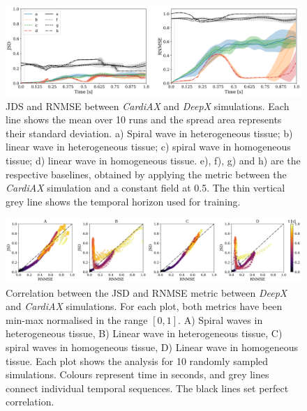 \documentclass[utf8]{frontiersSCNS} %
\begin{document}
\begin{figure}[!htp]
\centering
\includegraphics[width=\textwidth]{Figure-3.png}
\caption{JDS and RNMSE between \textit{CardiAX} and \textit{DeepX} simulations. Each line shows the mean over 10 runs and the spread area represents their standard deviation. a) Spiral wave in heterogeneous tissue; b) linear wave in heterogeneous tissue; c) spiral wave in homogeneous tissue; d) linear wave in homogeneous tissue. e), f), g) and h) are the respective baselines, obtained by applying the metric between the \textit{CardiAX} simulation and a constant field at 0.5. The thin vertical grey line shows the temporal horizon used for training.
}
\label{fig:3}
\end{figure}

\begin{figure}[!htp]
\centering
\includegraphics[width=\textwidth]{Figure-4.png}
\caption{Correlation between the JSD and RNMSE metric between \textit{DeepX} and \textit{CardiAX} simulations. For each plot, both metrics have been min-max normalised in the range $[0, 1]$. A) Spiral waves in heterogeneous tissue, B) Linear wave in heterogeneous tissue, C) spiral waves in homogeneous tissue, D) Linear wave in homogeneous tissue. Each plot shows the analysis for 10 randomly sampled simulations. Colours represent time in seconds, and grey lines connect individual temporal sequences. The black lines set perfect correlation.
}
\label{fig:4}
\end{figure}
\end{document}
